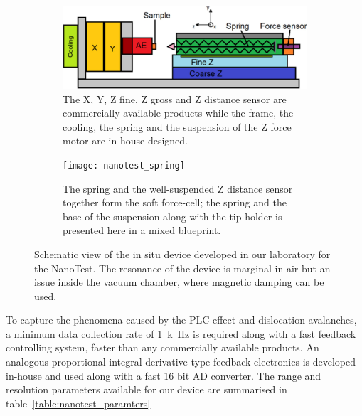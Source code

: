 \begin{figure}[htbp!] 
  \centering
  \begin{subfigure}[b]{0.48\textwidth}
    \includegraphics[width=\textwidth]{nanotest}
    \caption{The X, Y, Z fine, Z gross and Z distance sensor are commercially available products while the frame, the cooling, the spring and the suspension of the Z force motor are in-house designed.}
    \label{fig:nanotest_schematic}   
  \end{subfigure}
  \hspace{0.01\textwidth}      
  \begin{subfigure}[b]{0.48\textwidth}
    \texttt{[image: nanotest\_spring]}
    \caption{The spring and the well-suspended Z distance sensor together form the soft force-cell; the spring and the base of the suspension along with the tip holder is presented here in a mixed blueprint.}
    \label{fig:nanotest_spring}
  \end{subfigure}
  \caption[In situ device]{Schematic view of the in situ device developed in our laboratory for the NanoTest. The resonance of the device is marginal in-air but an issue inside the vacuum chamber, where magnetic damping can be used.}
  \label{fig:nanotest}
\end{figure}

To capture the phenomena caused by the PLC effect and dislocation avalanches, a minimum data collection rate of \SI{1}{k\hertz} is required along with a fast feedback controlling system, faster than any commercially available products. An analogous proportional-integral-derivative-type feedback electronics is developed in-house and used along with a fast 16 bit AD converter. The range and resolution parameters available for our device are summarised in table~\ref{table:nanotest_paramters}

